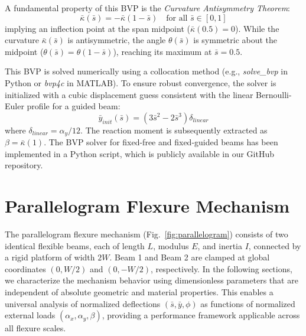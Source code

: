 \documentclass[colorlinks,upint,subscriptcorrection,varvw,hyphenate,balance]{asmeconf} %
\newcommand{\ybar}{\bar{y}}
\newcommand{\sbar}{\bar{s}}
\newcommand{\kbar}{\bar{\kappa}}
\begin{document}
A fundamental property of this BVP is the \textit{Curvature Antisymmetry Theorem}:
\begin{equation}
\kbar(\sbar) = -\kbar(1-\sbar) \quad \text{for all } \sbar \in [0,1]
\label{eq:antisymmetry}
\end{equation}
implying an inflection point at the span midpoint ($\kbar(0.5) = 0$). While the curvature $\kbar(\sbar)$ is antisymmetric, the angle $\theta(\sbar)$ is symmetric about the midpoint ($\theta(\sbar) = \theta(1-\sbar)$), reaching its maximum at $\sbar = 0.5$.

This BVP is solved numerically using a collocation method (e.g., \textit{solve\_bvp} in Python or \textit{bvp4c} in MATLAB). To ensure robust convergence, the solver is initialized with a cubic displacement guess consistent with the linear Bernoulli-Euler profile for a guided beam:
\begin{equation}
\ybar_{init}(\sbar) = (3\sbar^2 - 2\sbar^3)\delta_{linear}
\label{eq:init_guess}
\end{equation}
where $\delta_{linear} = \alpha_y/12$. The reaction moment is subsequently extracted as $\beta = \kbar(1)$. The BVP solver for fixed-free and fixed-guided beams has been implemented in a Python script, which is publicly available in our GitHub repository.

\section{Parallelogram Flexure Mechanism}
\label{sec:parallelogram}
The parallelogram flexure mechanism (Fig.~\ref{fig:parallelogram}) consists of two identical flexible beams, each of length $L$, modulus $E$, and inertia $I$, connected by a rigid platform of width $2W$. Beam 1 and Beam 2 are clamped at global coordinates $(0, W/2)$ and $(0, -W/2)$, respectively. In the following sections, we characterize the mechanism behavior using dimensionless parameters that are independent of absolute geometric and material properties. This enables a universal analysis of normalized deflections $(\sbar, \ybar, \phi)$ as functions of normalized external loads $(\alpha_x, \alpha_y, \beta)$, providing a performance framework applicable across all flexure scales.
\end{document}

